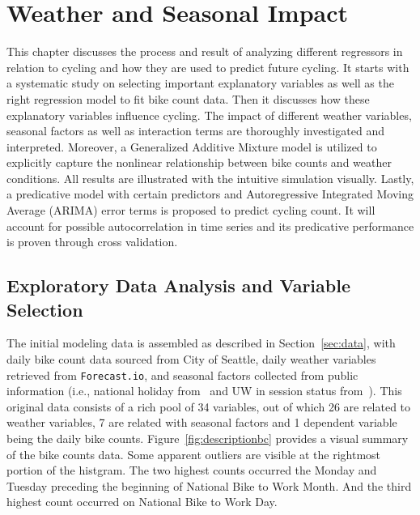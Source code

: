 \documentclass [11pt, proquest] {uwthesis}[2015/03/03]
\begin{document}
 
\chapter{Weather and Seasonal Impact}

This chapter discusses the process and result of analyzing different regressors in relation to cycling and how they are used to predict future cycling. It starts with a systematic study on selecting important explanatory variables as well as the right regression model to fit bike count data. Then it discusses how these explanatory variables influence cycling. The impact of different weather variables, seasonal factors as well as interaction terms are thoroughly investigated and interpreted. Moreover, a Generalized  Additive Mixture model is utilized to explicitly capture the nonlinear relationship between bike counts and weather conditions. All results are illustrated with the intuitive simulation visually. Lastly, a predicative model with certain predictors and Autoregressive Integrated Moving Average (ARIMA) error terms is proposed to predict cycling count. It will account for possible autocorrelation in time series and its predicative performance is proven through cross validation.


\section{Exploratory Data Analysis and Variable Selection}
\label{sec:eda}

The initial modeling data is assembled as described in Section~\ref{sec:data}, with daily bike count data sourced from City of Seattle, daily weather variables retrieved from \texttt{Forecast.io}, and seasonal factors collected from public information (i.e., national holiday from~\cite{holiday} and UW in session status from~\cite{uwcalendar}). This original data consists of a rich pool of 34 variables, out of which 26 are related to weather variables, 7 are related with seasonal factors and 1 dependent variable being the daily bike counts. Figure~\ref{fig:descriptionbc} provides a visual summary of the bike counts data. Some apparent outliers are visible at the rightmost portion of the histgram. The two highest counts occurred the Monday and Tuesday preceding the beginning of National Bike to Work Month. And the third highest count occurred on National Bike to Work Day.
\end{document}

